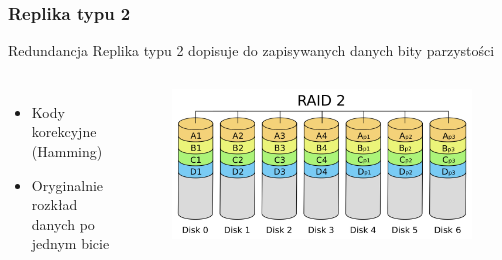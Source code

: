 \documentclass{beamer}
\begin{document}
\begin{frame}
	\frametitle{Replika typu 2}
	\begin{block}{Redundancja}
		Replika typu 2 dopisuje do zapisywanych danych bity parzystości
	\end{block}
	\begin{columns}
		\begin{itemize}
			\item Kody korekcyjne (Hamming)
			\item Oryginalnie rozkład danych po jednym bicie
		\end{itemize}
		\begin{figure}
			\includegraphics[scale=0.1]{raid-2.png}
		\end{figure}
	\end{columns}
\end{frame}
			
\end{document}
